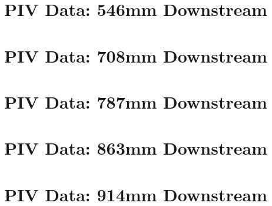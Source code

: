 

\chapter{PIV Data: 546mm Downstream}












\chapter{PIV Data: 708mm Downstream}












\chapter{PIV Data: 787mm Downstream}












\chapter{PIV Data: 863mm Downstream}












\chapter{PIV Data: 914mm Downstream}












